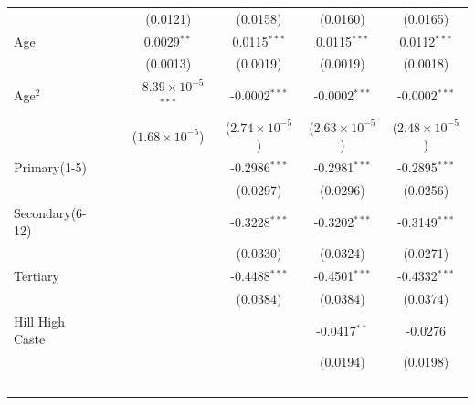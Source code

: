 \begin{tabular}{lccccc}
                                                     &                 & (0.0121)                       & (0.0158)                & (0.0160)                & (0.0165)\\   
   Age                                               &                 & 0.0029$^{**}$                  & 0.0115$^{***}$          & 0.0115$^{***}$          & 0.0112$^{***}$\\   
                                                     &                 & (0.0013)                       & (0.0019)                & (0.0019)                & (0.0018)\\   
   Age$^2$                                      &                 & $-8.39\times 10^{-5}$$^{***}$  & -0.0002$^{***}$         & -0.0002$^{***}$         & -0.0002$^{***}$\\   
                                                     &                 & ($1.68\times 10^{-5}$)         & ($2.74\times 10^{-5}$)  & ($2.63\times 10^{-5}$)  & ($2.48\times 10^{-5}$)\\    
   Primary(1-5)           &                 &                                & -0.2986$^{***}$         & -0.2981$^{***}$         & -0.2895$^{***}$\\   
                                                     &                 &                                & (0.0297)                & (0.0296)                & (0.0256)\\   
   Secondary(6-12)        &                 &                                & -0.3228$^{***}$         & -0.3202$^{***}$         & -0.3149$^{***}$\\   
                                                     &                 &                                & (0.0330)                & (0.0324)                & (0.0271)\\   
   Tertiary               &                 &                                & -0.4488$^{***}$         & -0.4501$^{***}$         & -0.4332$^{***}$\\   
                                                     &                 &                                & (0.0384)                & (0.0384)                & (0.0374)\\   
  Hill High Caste                    &                 &                                &                         & -0.0417$^{**}$          & -0.0276\\   
                                                     &                 &                                &                         & (0.0194)                & (0.0198)\\   
$$
\end{tabular}
